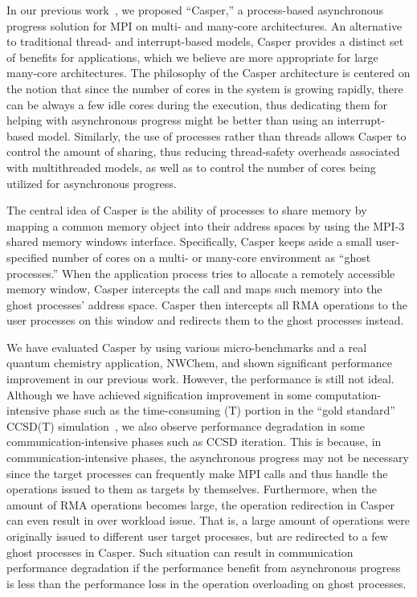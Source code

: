 In our previous work~\cite{casper}, we proposed ``Casper,''
a process-based asynchronous progress solution for MPI on multi- and
many-core architectures. An alternative to traditional thread- and
interrupt-based models, Casper provides a distinct set of benefits
for applications, which we believe are more appropriate for large
many-core architectures. The philosophy of the Casper architecture
is centered on the notion that since the number of cores in the system
is growing rapidly, there can be always a few idle cores during the
execution, thus dedicating them for helping with asynchronous progress
might be better than using an interrupt-based model. Similarly, the use
of processes rather than threads allows Casper to control the amount
of sharing, thus reducing thread-safety overheads associated with
multithreaded models, as well as to control the number of cores being
utilized for asynchronous progress.

The central idea of Casper is the ability of processes to share
memory by mapping a common memory object into their address spaces
by using the MPI-3 shared memory windows interface.  Specifically, Casper
keeps aside a small user-specified number of cores on a multi- or
many-core environment as ``ghost processes.''  When the application
process tries to allocate a remotely accessible memory window, Casper
intercepts the call and maps such memory into the ghost processes'
address space.  Casper then intercepts all RMA operations to the user
processes on this window and redirects them to the ghost processes
instead.

We have evaluated Casper by using various micro-benchmarks and a real
quantum chemistry application, NWChem, and shown significant performance
improvement in our previous work. However, the performance is still not
ideal. Although we have achieved signification improvement in some
computation-intensive phase such as the time-consuming (T) portion in
the ``gold standard'' CCSD(T) simulation~\cite{casper}\cite{casper-scaling},
we also observe performance degradation in some communication-intensive
phases such as CCSD iteration. This is because, in communication-intensive
phases, the asynchronous progress may not be necessary since the target
processes can frequently make MPI calls and thus handle the operations
issued to them as targets by themselves. Furthermore, when the amount of RMA
operations becomes large, the operation redirection in Casper can even
result in over workload issue. That is, a large amount of operations
were originally issued to different user target processes, but are
redirected to a few ghost processes in Casper. Such situation can result in
communication performance degradation if the performance benefit from
asynchronous progress is less than the performance loss in the operation
overloading on ghost processes.

